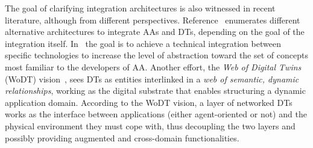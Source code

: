 The goal of clarifying integration architectures is also witnessed in recent literature, although from different perspectives.
% 
Reference~\cite{DBLP:conf/atal/MarianiPR22} enumerates different alternative architectures to integrate AAs and DTs, depending on the goal of the integration itself. 
%
In~\cite{DBLP:conf/emas/MarianiPR23} the goal is to achieve a technical integration between specific technologies to increase the level of abstraction toward the set of concepts most familiar to the developers of AA. 
%
Another effort, the \emph{Web of Digital Twins} (WoDT) vision~\cite{10.1145/3507909}, 
sees DTs as entities interlinked in a \emph{web of semantic, dynamic relationships}, 
working as the digital substrate that enables structuring a dynamic application domain.
%
According to the WoDT vision, 
a layer of networked DTs works as the interface between applications
(either agent-oriented or not)
and the physical environment they must cope with, 
thus decoupling the two layers and possibly providing augmented and cross-domain functionalities.

